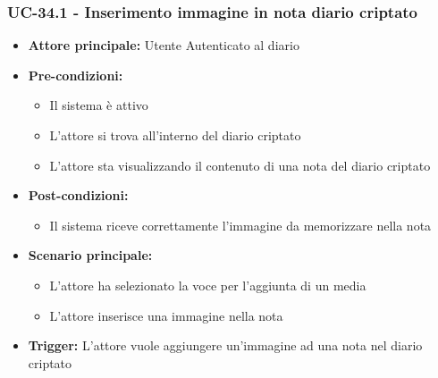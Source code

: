 \documentclass[a4paper,12pt]{article}
\begin{document}
\subsubsection{UC-34.1 - Inserimento immagine in nota diario criptato} \label{subsec:UC-34.1}
\begin{itemize}
    \item \textbf{Attore principale:} Utente Autenticato al diario
    \item \textbf{Pre-condizioni:}
    \begin{itemize}
        \item Il sistema è attivo
        \item L'attore si trova all'interno del diario criptato
        \item L'attore sta visualizzando il contenuto di una nota del diario criptato
    \end{itemize}
    \item \textbf{Post-condizioni:}
    \begin{itemize}
        \item Il sistema riceve correttamente l'immagine da memorizzare nella nota
    \end{itemize}
    \item \textbf{Scenario principale:}
    \begin{itemize}
        \item L'attore ha selezionato la voce per l'aggiunta di un media
        \item L'attore inserisce una immagine nella nota
    \end{itemize}
    \item \textbf{Trigger:} L'attore vuole aggiungere un'immagine ad una nota nel diario criptato
\end{itemize}
\end{document}
